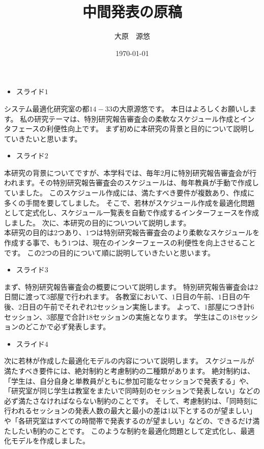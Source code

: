 \documentclass[a4j]{jarticle}
\title{\huge 中間発表の原稿}
\author{大原　源悠}
\date{\today}
\begin{document}
%
\maketitle
%

\begin{itemize}
\item スライド$1$
\end{itemize}
システム最適化研究室の都$14-33$の大原源悠です。
本日はよろしくお願いします。
私の研究テーマは、特別研究報告審査会の柔軟なスケジュール作成とインタフェースの利便性向上です。
まず初めに本研究の背景と目的について説明していきたいと思います。
%

\begin{itemize}
\item スライド$2$
\end{itemize}
本研究の背景についてですが、本学科では、毎年$2$月に特別研究報告審査会が行われます。その特別研究報告審査会のスケジュールは、毎年教員が手動で作成していました。
このスケジュール作成には、満たすべき要件が複数あり、作成に多くの手間を要してしました。
そこで、若林がスケジュール作成を最適化問題として定式化し、スケジュール一覧表を自動で作成するインターフェースを作成しました。
次に、本研究の目的についついて説明します。\\
本研究の目的は$2$つあり、$1$つは特別研究報告審査会のより柔軟なスケジュールを作成する事で、もう$1$つは、現在のインターフェースの利便性を向上させることです。
この$2$つの目的について順に説明していきたいと思います。
%

\begin{itemize}
\item スライド$3$
\end{itemize}
まず、特別研究報告審査会の概要について説明します。
特別研究報告審査会は$2$日間に渡って$3$部屋で行われます。
各教室において、$1$日目の午前、$1$日目の午後、$2$日目の午前でそれぞれ$2$セッション実施します。
よって、$1$部屋につき計$6$セッション、$3$部屋で合計$18$セッションの実施となります。
学生はこの$18$セッションのどこかで必ず発表します。
%

\begin{itemize}
\item スライド$4$
\end{itemize}
次に若林が作成した最適化モデルの内容について説明します。
スケジュールが満たすべき要件には、絶対制約と考慮制約の二種類があります。
絶対制約は、「学生は、自分自身と単教員がともに参加可能なセッションで発表する」や、「研究室が同じ学生は教室をまたいで同時刻のセッションで発表しない」などの必ず満たさなければならない制約のことです。
そして、考慮制約は、「同時刻に行われるセッションの発表人数の最大と最小の差は$1$以下とするのが望ましい」や「各研究室はすべての時間帯で発表するのが望ましい」などの、できるだけ満たしたい制約のことです。
このような制約を最適化問題として定式化し、最適化モデルを作成しました。
\end{document}
